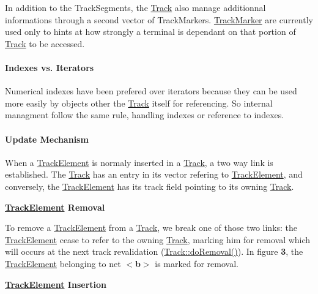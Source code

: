 In addition to the Track\+Segments, the \mbox{\hyperlink{classKite_1_1Track}{Track}} also manage additionnal informations through a second vector of Track\+Markers. \mbox{\hyperlink{classKite_1_1TrackMarker}{Track\+Marker}} are currently used only to hints at how strongly a terminal is dependant on that portion of \mbox{\hyperlink{classKite_1_1Track}{Track}} to be accessed.\hypertarget{classKite_1_1Track_ssecTrackIndexes}{}\paragraph{Indexes vs. Iterators}\label{classKite_1_1Track_ssecTrackIndexes}
Numerical indexes have been prefered over iterators because they can be used more easily by objects other the \mbox{\hyperlink{classKite_1_1Track}{Track}} itself for referencing. So internal managment follow the same rule, handling indexes or reference to indexes.\hypertarget{classKite_1_1Track_ssecTrackUpdate}{}\paragraph{Update Mechanism}\label{classKite_1_1Track_ssecTrackUpdate}
When a \mbox{\hyperlink{classKite_1_1TrackElement}{Track\+Element}} is normaly inserted in a \mbox{\hyperlink{classKite_1_1Track}{Track}}, a two way link is established. The \mbox{\hyperlink{classKite_1_1Track}{Track}} has an entry in it\textquotesingle{}s vector refering to \mbox{\hyperlink{classKite_1_1TrackElement}{Track\+Element}}, and conversely, the \mbox{\hyperlink{classKite_1_1TrackElement}{Track\+Element}} has it\textquotesingle{}s {\ttfamily track} field pointing to it\textquotesingle{}s owning \mbox{\hyperlink{classKite_1_1Track}{Track}}.

{\bfseries \mbox{\hyperlink{classKite_1_1TrackElement}{Track\+Element}} Removal}

To remove a \mbox{\hyperlink{classKite_1_1TrackElement}{Track\+Element}} from a \mbox{\hyperlink{classKite_1_1Track}{Track}}, we break one of those two links\+: the \mbox{\hyperlink{classKite_1_1TrackElement}{Track\+Element}} cease to refer to the owning \mbox{\hyperlink{classKite_1_1Track}{Track}}, marking him for removal which will occurs at the next track revalidation (\mbox{\hyperlink{classKite_1_1Track_abfffcd781865b94f62f27a1e7be99a38}{Track\+::do\+Removal()}}). In figure {\bfseries 3}, the \mbox{\hyperlink{classKite_1_1TrackElement}{Track\+Element}} belonging to net {\bfseries $<$b$>$} is marked for removal.

 {\bfseries \mbox{\hyperlink{classKite_1_1TrackElement}{Track\+Element}} Insertion}

